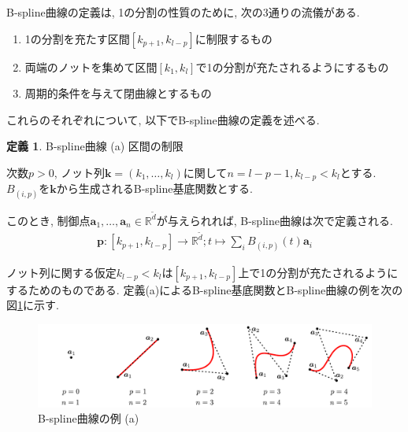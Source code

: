 \documentclass{jsarticle}
\newcommand\setR{\mathbb{R}}
\theoremstyle{definition}%
\newtheorem{defn}[thm]{定義}
\begin{document}
\newpage

B-spline曲線の定義は, 1の分割の性質のために, 次の3通りの流儀がある.
\begin{enumerate}
    \renewcommand{\labelenumi}{(\alph{enumi})}
    \item 1の分割を充たす区間$[k_{p+1},k_{l-p}]$に制限するもの
    \item 両端のノットを集めて区間$[k_1,k_l]$で1の分割が充たされるようにするもの
    \item 周期的条件を与えて閉曲線とするもの
\end{enumerate}
これらのそれぞれについて, 以下でB-spline曲線の定義を述べる.

\begin{screen}
	\begin{defn}
        \label{Def300a}
		B-spline曲線 (a) 区間の制限

        次数$p>0$, ノット列$\bm{k}=(k_1,\dots,k_l)$に関して$n=l-p-1, k_{l-p}<k_{l}$とする.
		$B_{(i,p)}$を$\bm{k}$から生成されるB-spline基底関数とする.

        このとき, 制御点$\bm{a}_1, \dots, \bm{a}_n\in \setR^{\tilde{d}}$が与えられれば, B-spline曲線は次で定義される.
		\begin{align}
			\bm{p}:[k_{p+1},k_{l-p}]\to \setR^{\tilde{d}};t\mapsto\sum_i B_{(i,p)}(t) \bm{a}_i
		\end{align}
	\end{defn}
\end{screen}
ノット列に関する仮定$k_{l-p}<k_{l}$は$[k_{p+1},k_{l-p}]$上で1の分割が充たされるようにするためのものである.
定義(a)によるB-spline基底関数とB-spline曲線の例を次の図\ref{Fig300a}に示す.
\addtocounter{footnote}{-1}
\begin{figure}[htbp]
	\centering
    \includegraphics[page=15,clip,width=160mm]{fig.pdf}
	\caption{B-spline曲線の例 (a)\protect\footnotemark}
	\label{Fig300a}
\end{figure}

\end{document}
